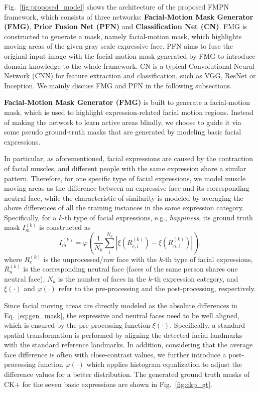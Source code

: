 \documentclass[conference,a4paper]{IEEEtran}
\begin{document}
Fig.~\ref{fig:proposed_model} shows the architecture of the proposed FMPN framework, which consists of three networks: \textbf{Facial-Motion Mask Generator (FMG)}, \textbf{Prior Fusion Net (PFN)} and \textbf{Classification Net (CN)}. FMG is constructed to generate a mask, namely facial-motion mask, which highlights moving areas of the given gray scale expressive face. PFN aims to fuse the original input image with the facial-motion mask generated by FMG to introduce domain knowledge to the whole framework. CN is a typical Convolutional Neural Network (CNN) for feature extraction and classification, such as VGG, ResNet or Inception. We mainly discuss FMG and PFN in the following subsections. 



\textbf{Facial-Motion Mask Generator (FMG)} is built to generate a facial-motion mask, which is used to highlight expression-related facial motion regions. Instead of making the network to learn active areas blindly, we choose to guide it via some pseudo ground-truth masks that are generated by modeling basic facial expressions. 

In particular, as aforementioned, facial expressions are caused by the contraction of facial muscles, and different people with the same expression share a similar pattern. Therefore, for one specific type of facial expressions, we model muscle moving areas as the difference between an expressive face and its corresponding neutral face, while the characteristic of similarity is modeled by averaging the above differences of all the training instances in the same expression category. Specifically, for a $k$-th type of facial expressions, e.g., \textit{happiness}, its ground truth mask $I_{m}^{(k)}$ is constructed as
\begin{equation}
\label{eq:gen_mask}
I_{m}^{(k)} = \varphi( \frac{1}{N_k}\sum ^{N_k}_i \left | \xi(R^{(k)}_{e,i}) - \xi(R^{(k)}_{n,i}) \right |), 
\end{equation}
where $R^{(k)}_{e}$ is the unprocessed/raw face with the $k$-th type of facial expressions, $R^{(k)}_{n}$ is the corresponding neutral face (faces of the same person shares one neutral face),
$N_k$ is the number of faces in the $k$-th expression category, and $\xi(\cdot)$ and $\varphi(\cdot)$ refer to the pre-processing and the post-processing, respectively.

Since facial moving areas are directly modeled as the absolute differences in Eq.~\eqref{eq:gen_mask}, the expressive and neutral faces need to be well aligned, which is ensured by the pre-processing function $\xi(\cdot)$. Specifically, a standard spatial transformation is performed by aligning the detected facial landmarks with the standard reference landmarks. In addition, 
considering that the average face difference is often with close-contrast values, we further introduce a post-processing function $\varphi(\cdot)$ which applies histogram equalization to adjust the difference values for a better distribution. The generated ground truth masks of CK+ \cite{lucey2010extended} for the seven basic expressions are shown in Fig.~\ref{fig:ckp_gt}.
\end{document}
